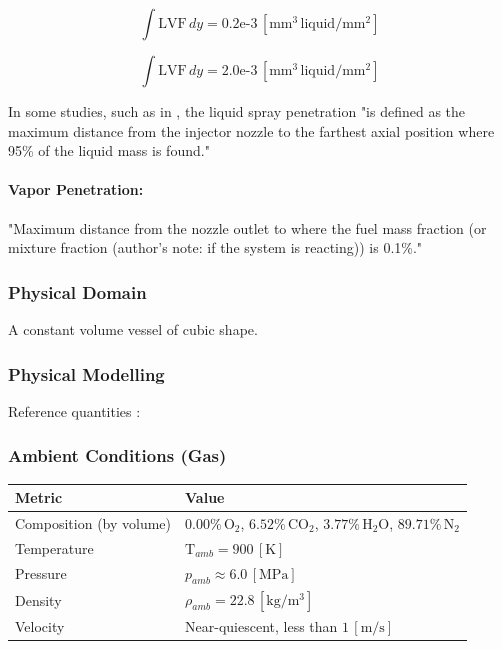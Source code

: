 \begin{equation}
    \int \mathrm{LVF} \, dy = 0.2\text{e-}3 \, [\mathrm{mm}^3 \, \text{liquid} / \mathrm{mm}^2]
\end{equation}

\begin{equation}
    \int \mathrm{LVF} \, dy = 2.0\text{e-}3 \, [\mathrm{mm}^3 \, \text{liquid} / \mathrm{mm}^2]
\end{equation}

In some studies, such as in \cite{ref7}, the liquid spray penetration "is defined as the maximum distance from the injector nozzle to the farthest axial position where 95\% of the liquid mass is found."

\paragraph{Vapor Penetration:} 
"Maximum distance from the nozzle outlet to where the fuel mass fraction (or mixture fraction (author's note: if the system is reacting)) is 0.1\%." \cite{ref6}

\subsubsection*{Physical Domain}
A constant volume vessel of cubic shape.

\subsubsection*{Physical Modelling}
Reference quantities \cite{ref1, ref7}:

\subsubsection*{Ambient Conditions (Gas)}
\begin{center}
\begin{tabular}{ll}
\hline
Metric & Value \\
\hline
Composition (by volume) & $0.00\%\,\mathrm{O}_2$, $6.52\%\,\mathrm{CO}_2$, $3.77\%\,\mathrm{H}_2\mathrm{O}$, $89.71\%\,\mathrm{N}_2$ \\
Temperature & $\mathrm{T}_{amb} = 900 \, [\mathrm{K}]$ \\
Pressure & $p_{amb} \approx 6.0 \, [\mathrm{MPa}]$ \\
Density & $\rho_{amb} = 22.8 \, [\mathrm{kg}/\mathrm{m}^3]$ \\
Velocity & Near-quiescent, less than $1 \, [\mathrm{m}/\mathrm{s}]$ \\
\hline
\end{tabular}
\end{center}

